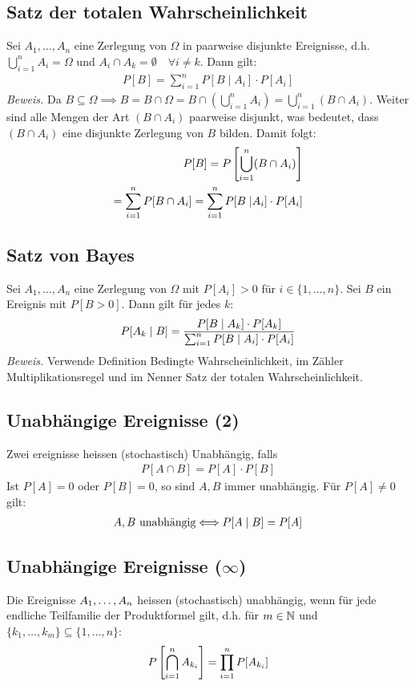 \subsection{Satz der totalen Wahrscheinlichkeit}
Sei $A_1, \dots, A_n$ eine Zerlegung von $\Omega$ in paarweise disjunkte
Ereignisse, d.h. $\bigcup_{i = 1}^n A_i = \Omega$ und $A_i \cap A_k = \emptyset
  \quad \forall i \neq k$. Dann gilt:
\begin{align*}
  P[B] = \sum_{i = 1}^n P[B \; | \; A_i] \cdot P[A_i]
\end{align*}
\emph{Beweis.}
Da $B \subseteq \Omega \implies B = B \cap \Omega
  = B \cap  (\bigcup_{i=1}^n A_i) = \bigcup_{i = 1}^n  (B \cap A_i)$.
Weiter sind alle Mengen der Art $ (B \cap A_i)$ paarweise disjunkt,
was bedeutet, dass $ (B \cap A_i)$ eine disjunkte Zerlegung von $B$
bilden. Damit folgt:
\begin{align*}
  P[B] = P \left[ \bigcup_{i = 1}^n  (B \cap A_i)\right] \\
  = \sum_{i = 1}^n P[B \cap A_i] = \sum_{i = 1}^n P[B \; | A_i] \cdot P[A_i]
\end{align*}
\subsection{Satz von Bayes}
Sei $A_1, \dots, A_n$ eine Zerlegung von $\Omega$ mit $P[A_i] > 0$ für $i \in
  \{1, \dots, n\}$. Sei $B$ ein Ereignis mit $P[B > 0]$. Dann gilt für jedes $k$:
\begin{align*}
  P[A_k \; | \; B] = \frac{P[B \; | \; A_k] \cdot P[A_k] }{\sum_{i = 1}^n P[B \; | \; A_i] \cdot P[A_i]}
\end{align*}
\emph{Beweis.} Verwende Definition Bedingte Wahrscheinlichkeit,
im Zähler Multiplikationsregel und im Nenner Satz der totalen Wahrscheinlichkeit.
\subsection{Unabhängige Ereignisse  (2)}
Zwei ereignisse heissen (stochastisch) Unabhängig, falls
\begin{align*}
  P[A \cap B] = P[A] \cdot P[B]
\end{align*}
Ist $P[A] = 0$ oder $P[B] = 0$, so sind $A, B$ immer unabhängig.
Für $P[A] \neq 0$ gilt:
\begin{align*}
  A, B \text{ unabhängig} \Longleftrightarrow P[A \; | \; B] = P[A]
\end{align*}
\subsection{Unabhängige Ereignisse  ($\infty$)}
Die Ereignisse $A_1, \dots, A_n$ heissen (stochastisch) unabhängig, wenn für jede
endliche Teilfamilie der Produktformel gilt, d.h. für $m \in \mathbb{N}$ und $\{k_1,
  \dots, k_m\} \subseteq \{1, \dots, n\}$:
\begin{align*}
  P \left[\bigcap_{i = 1}^n A_{k_i} \right] = \prod_{i = 1}^n P[A_{k_i}]
\end{align*}
